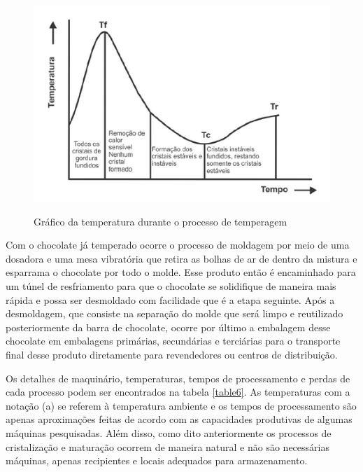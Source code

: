 \documentclass[
	12pt,				%
	openright,			%
	oneside,			%
	a4paper,			%
	english,			%
	french,				%
	spanish,			%
	brazil				%
	]{abntex2}
\begin{document}
\begin{figure}[H]
\begin{center}
\caption{Gráfico da temperatura durante o processo de temperagem}
\includegraphics[scale=0.7]{../../Pictures/graficotemperagem.png} 
\label{figtemp}
\end{center}
\end{figure}

Com o chocolate já temperado ocorre o processo de moldagem por meio de uma dosadora e uma mesa vibratória que retira as bolhas de ar de dentro da mistura e esparrama o chocolate por todo o molde. Esse produto então é encaminhado para um túnel de resfriamento para que o chocolate se solidifique de maneira mais rápida e possa ser desmoldado com facilidade que é a etapa seguinte. Após a desmoldagem, que consiste na separação do molde que será limpo e reutilizado posteriormente da barra de chocolate, ocorre por último a embalagem desse chocolate em embalagens primárias, secundárias e terciárias para o transporte final desse produto diretamente para revendedores ou centros de distribuição.

Os detalhes de maquinário, temperaturas, tempos de processamento e perdas de cada processo podem ser encontrados na tabela \ref{table6}. As temperaturas com a notação (a) se referem à temperatura ambiente e os tempos de processamento são apenas aproximações feitas de acordo com as capacidades produtivas de algumas máquinas pesquisadas. Além disso, como dito anteriormente os processos de cristalização e maturação ocorrem de maneira natural e não são necessárias máquinas, apenas recipientes e locais adequados para armazenamento.
\end{document}
